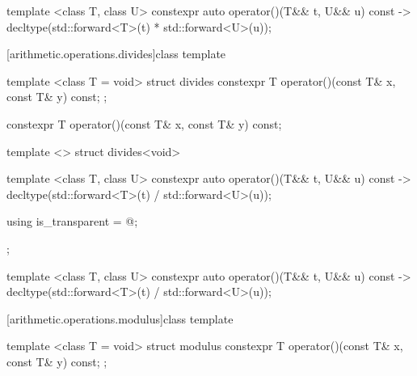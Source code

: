 %
\begin{itemdecl}
template <class T, class U> constexpr auto operator()(T&& t, U&& u) const
    -> decltype(std::forward<T>(t) * std::forward<U>(u));
\end{itemdecl}

\begin{itemdescr}
\pnum\returns {}
\end{itemdescr}

[arithmetic.operations.divides]{class template }

%
\begin{itemdecl}
template <class T = void> struct divides {
  constexpr T operator()(const T& x, const T& y) const;
};
\end{itemdecl}

%
\begin{itemdecl}
constexpr T operator()(const T& x, const T& y) const;
\end{itemdecl}

\begin{itemdescr}
\pnum\returns {}
\end{itemdescr}

%
\begin{itemdecl}
template <> struct divides<void> {
  template <class T, class U> constexpr auto operator()(T&& t, U&& u) const
    -> decltype(std::forward<T>(t) / std::forward<U>(u));

  using is_transparent = @\unspec@;
};
\end{itemdecl}

%
\begin{itemdecl}
template <class T, class U> constexpr auto operator()(T&& t, U&& u) const
    -> decltype(std::forward<T>(t) / std::forward<U>(u));
\end{itemdecl}

\begin{itemdescr}
\pnum\returns {}
\end{itemdescr}

[arithmetic.operations.modulus]{class template }

%
\begin{itemdecl}
template <class T = void> struct modulus {
  constexpr T operator()(const T& x, const T& y) const;
};
\end{itemdecl}

